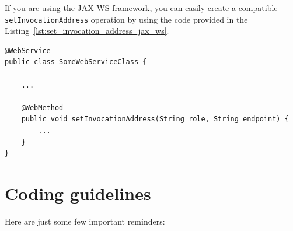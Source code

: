 \documentclass[a4paper, 10pt]{article}
\begin{document}
If you are using the JAX-WS framework, you can easily create a compatible \texttt{setInvocationAddress} operation by using the code provided in the Listing~\ref{lst:set_invocation_address_jax_ws}.

\lstset{
language=Java
}

{\footnotesize
\begin{lstlisting}[caption=Implementing \texttt{setInvocationAddress} with JAX-WS, label=lst:set_invocation_address_jax_ws] 
@WebService
public class SomeWebServiceClass {

    ...
    
    @WebMethod
    public void setInvocationAddress(String role, String endpoint) {
		...
    }
}
\end{lstlisting}
}

\section{Coding guidelines}

Here are just some few important reminders:
\end{document}
